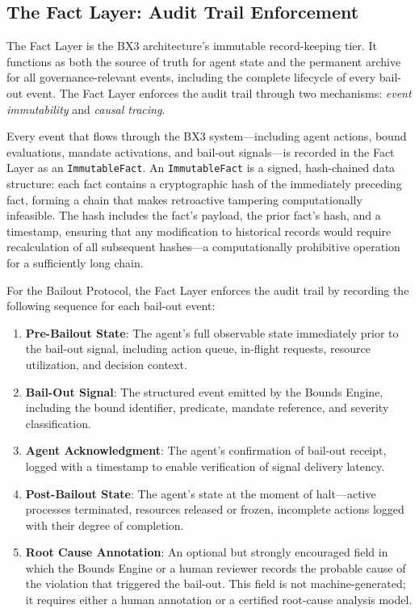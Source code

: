 \subsection{The Fact Layer: Audit Trail Enforcement}
\label{subsection:bailout-fact-layer}

The Fact Layer is the BX3 architecture's immutable record-keeping tier. It functions as both the source of truth for agent state and the permanent archive for all governance-relevant events, including the complete lifecycle of every bail-out event. The Fact Layer enforces the audit trail through two mechanisms: \textit{event immutability} and \textit{causal tracing}.

Every event that flows through the BX3 system—including agent actions, bound evaluations, mandate activations, and bail-out signals—is recorded in the Fact Layer as an \texttt{ImmutableFact}. An \texttt{ImmutableFact} is a signed, hash-chained data structure: each fact contains a cryptographic hash of the immediately preceding fact, forming a chain that makes retroactive tampering computationally infeasible. The hash includes the fact's payload, the prior fact's hash, and a timestamp, ensuring that any modification to historical records would require recalculation of all subsequent hashes—a computationally prohibitive operation for a sufficiently long chain.

For the Bailout Protocol, the Fact Layer enforces the audit trail by recording the following sequence for each bail-out event:

\begin{enumerate}
  \item \textbf{Pre-Bailout State}: The agent's full observable state immediately prior to the bail-out signal, including action queue, in-flight requests, resource utilization, and decision context.

  \item \textbf{Bail-Out Signal}: The structured event emitted by the Bounds Engine, including the bound identifier, predicate, mandate reference, and severity classification.

  \item \textbf{Agent Acknowledgment}: The agent's confirmation of bail-out receipt, logged with a timestamp to enable verification of signal delivery latency.

  \item \textbf{Post-Bailout State}: The agent's state at the moment of halt—active processes terminated, resources released or frozen, incomplete actions logged with their degree of completion.

  \item \textbf{Root Cause Annotation}: An optional but strongly encouraged field in which the Bounds Engine or a human reviewer records the probable cause of the violation that triggered the bail-out. This field is not machine-generated; it requires either a human annotation or a certified root-cause analysis model.
\end{enumerate}

